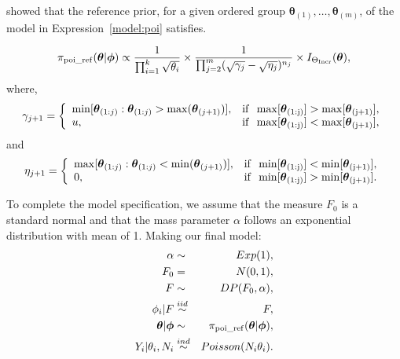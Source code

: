 \documentclass[11pt,a4paper,notitlepage]{article}
\begin{document}
\cite{SonksenPeruggia2012} showed that the reference prior, for a
given ordered group $\boldsymbol{\theta}_{(1)}, \ldots,
\boldsymbol{\theta}_{(m)}$, of the model in
Expression~\eqref{model:poi} satisfies.

\begin{equation}
\pi_{\rm poi\_ref}(\boldsymbol{\theta}|\boldsymbol{\phi})  
 \propto  \frac{1}{\prod_{i=1}^{k}\sqrt{\theta_i}} \times 
\frac{1}{\prod_{j=2}^{m}(\sqrt{\gamma_j} - 
\sqrt{\eta_{j}})^{n_j}}  \times I_{\Theta_{\rm
  Incr}}(\boldsymbol{\theta}),
\label{eq:ref_incr}
\end{equation}
where,
\[
\gamma_{j+1} = \left\{\begin{array}{ll}
\min[\boldsymbol{\theta}_{(1:j)} : \boldsymbol{\theta}_{(1:j)}>\max(\boldsymbol{\theta}_{(j+1)})], & \rm{if} \,\,\, 
\max[\boldsymbol{\theta}_{(1:j)}] > 
\max[\boldsymbol{\theta}_{(j+1)}], \\
u, &  \rm{if} \,\,\, 
\max[\boldsymbol{\theta}_{(1:j)}] < 
\max[\boldsymbol{\theta}_{(j+1)}], \\
\end{array}
\right.
\] 
and 
\[
\eta_{j+1} = \left\{\begin{array}{ll}
\max[\boldsymbol{\theta}_{(1:j)}:\boldsymbol{\theta}_{(1:j)}<\min(\boldsymbol{\theta}_{(j+1)}) ], & \rm{if} \,\,\, 
\min[\boldsymbol{\theta}_{(1:j)}] < 
\min[\boldsymbol{\theta}_{(j+1)}], \\
0, &  \rm{if} \,\,\, 
\min[\boldsymbol{\theta}_{(1:j)}] > 
\min[\boldsymbol{\theta}_{(j+1)}]. \\  %
\end{array}
\right.
\] 

To complete the model specification, we assume that the measure $F_0$ is
a standard normal and that the mass parameter $\alpha$ follows an
exponential distribution with mean of 1.  Making our final model:
\begin{eqnarray*}
\alpha &\sim& Exp(1),\\
F_0 &=& N(0,1),\\
F &\sim& DP(F_0, \alpha),\\
\phi_i|F &\stackrel{iid}{\sim}& F,\\
\boldsymbol{\theta}|\boldsymbol{\phi} &\sim&  \pi_{\rm poi\_ref}(\boldsymbol{\theta}|\boldsymbol{\phi}), \\
Y_i | \theta_i, N_i &\stackrel{ind}{\sim}& Poisson(N_i\theta_i).
\end{eqnarray*}
\end{document}
